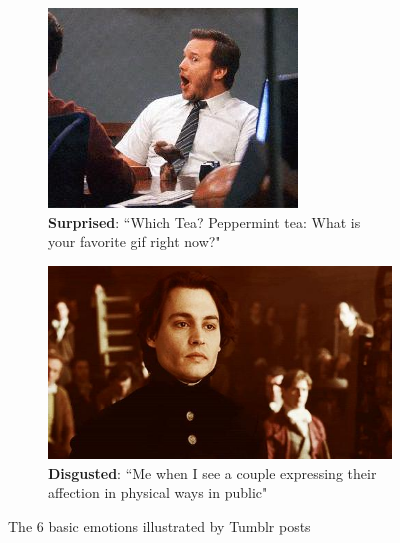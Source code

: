 \begin{figure}
\begin{subfigure}[t]{.5\textwidth}
  \includegraphics[width=.8\linewidth]{Images/surprised.jpg}
  \caption{\textbf{Surprised}: ``Which Tea? Peppermint tea: What is your favorite gif right now?"}
\end{subfigure}
\begin{subfigure}[t]{.5\textwidth}
  \vskip 0pt 
  \centering
  \includegraphics[width=.8\linewidth]{Images/disgusted.jpg}
  \caption{\textbf{Disgusted}: ``Me when I see a couple expressing their affection in physical ways in public"}
\end{subfigure}
\caption{The 6 basic emotions illustrated by Tumblr posts \cite{tumblr-photos}}
\label{fig:emotions}
\end{figure}